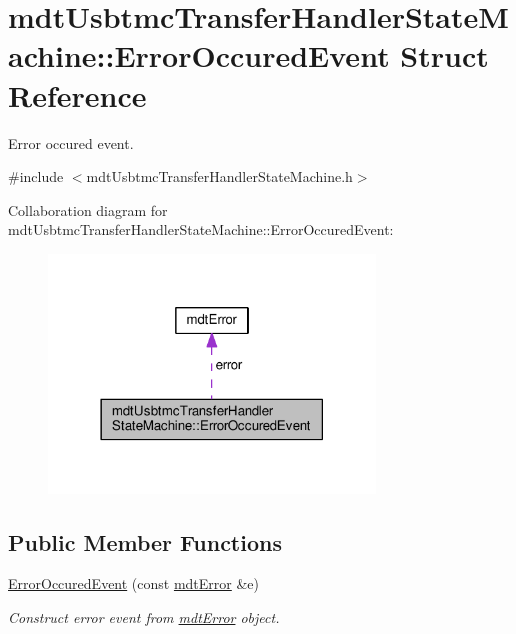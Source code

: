 \hypertarget{structmdt_usbtmc_transfer_handler_state_machine_1_1_error_occured_event}{\section{mdt\-Usbtmc\-Transfer\-Handler\-State\-Machine\-:\-:Error\-Occured\-Event Struct Reference}
\label{structmdt_usbtmc_transfer_handler_state_machine_1_1_error_occured_event}
}


Error occured event.  




{\ttfamily \#include $<$mdt\-Usbtmc\-Transfer\-Handler\-State\-Machine.\-h$>$}



Collaboration diagram for mdt\-Usbtmc\-Transfer\-Handler\-State\-Machine\-:\-:Error\-Occured\-Event\-:
\nopagebreak
\begin{figure}[H]
\begin{center}
\leavevmode
\includegraphics[width=246pt]{structmdt_usbtmc_transfer_handler_state_machine_1_1_error_occured_event__coll__graph}
\end{center}
\end{figure}
\subsection*{Public Member Functions}
\begin{DoxyCompactItemize}
\item 
\hyperlink{structmdt_usbtmc_transfer_handler_state_machine_1_1_error_occured_event_aa13abdce6636b41fc2e6b919331316b7}{Error\-Occured\-Event} (const \hyperlink{classmdt_error}{mdt\-Error} \&e)
\begin{DoxyCompactList}\small\item\em Construct error event from \hyperlink{classmdt_error}{mdt\-Error} object. \end{DoxyCompactList}\end{DoxyCompactItemize}
